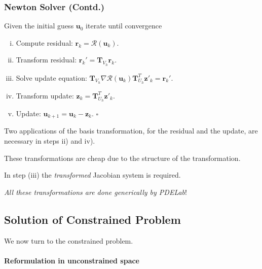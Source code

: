 \begin{frame}
\frametitle<presentation>{Newton Solver (Contd.)}
\begin{Alg}
Given the initial guess $\mathbf{u}_{0}$ iterate until convergence
\begin{enumerate}[i)]
\item Compute residual:
  $\mathbf{r}_k=\mathcal{R}\left(\mathbf{u}_{k}\right)$.
\item Transform residual: $\mathbf{r}_k' = \mathbf{T}_{V_h}
  \mathbf{r}_k$.
\item Solve update equation:
  $\mathbf{T}_{V_h}\nabla\mathcal{R}\left(\mathbf{u}_{k}\right)
\mathbf{T}^T_{U_h} \mathbf{z}'_{k} =  \mathbf{r}_k'$.
\item Transform update: $\mathbf{z}_{k} =
  \mathbf{T}^T_{U_h}\mathbf{z}'_k$.
\item Update: $\mathbf{u}_{k+1} = \mathbf{u}_k
- \mathbf{z}_k$. \hfill$\square$
\end{enumerate}
\end{Alg}

Two applications of the basis transformation, for the
residual and the update, are necessary in steps ii) and iv).

These transformations are cheap due to the structure of the
transformation.

In step (iii) the \textit{transformed}
Jacobian system is required.

\textit{All these transformations are done generically by PDELab}!
\end{frame}

\subsection{Solution of Constrained Problem}

We now turn to the constrained problem.

\paragraph{Reformulation in unconstrained space}

